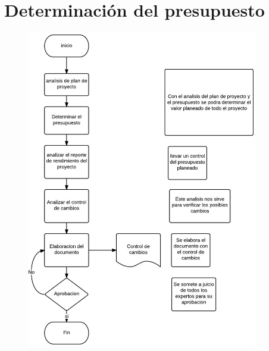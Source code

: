 \section{Determinaci\'on del presupuesto}
%
\begin{figure}[H]
    \centering
    \includegraphics[width=0.9\textwidth]{images/controldecostos.png}
\end{figure}
%